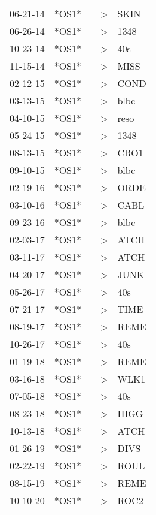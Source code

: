 \begin{supertabular}{lllll}
 06-21-14 &  *OS1* &    &     \textgreater &  SKIN \\
 06-26-14 &  *OS1* &    &     \textgreater &  1348 \\
 10-23-14 &  *OS1* &    &     \textgreater &   40s \\
 11-15-14 &  *OS1* &    &     \textgreater &  MISS \\
 02-12-15 &  *OS1* &    &     \textgreater &  COND \\
 03-13-15 &  *OS1* &    &     \textgreater &  blbc \\
 04-10-15 &  *OS1* &    &     \textgreater &  reso \\
 05-24-15 &  *OS1* &    &     \textgreater &  1348 \\
 08-13-15 &  *OS1* &    &     \textgreater &  CRO1 \\
 09-10-15 &  *OS1* &    &     \textgreater &  blbc \\
 02-19-16 &  *OS1* &    &     \textgreater &  ORDE \\
 03-10-16 &  *OS1* &    &     \textgreater &  CABL \\
 09-23-16 &  *OS1* &    &     \textgreater &  blbc \\
 02-03-17 &  *OS1* &    &     \textgreater &  ATCH \\
 03-11-17 &  *OS1* &    &     \textgreater &  ATCH \\
 04-20-17 &  *OS1* &    &     \textgreater &  JUNK \\
 05-26-17 &  *OS1* &    &     \textgreater &   40s \\
 07-21-17 &  *OS1* &    &     \textgreater &  TIME \\
 08-19-17 &  *OS1* &    &     \textgreater &  REME \\
 10-26-17 &  *OS1* &    &     \textgreater &   40s \\
 01-19-18 &  *OS1* &    &     \textgreater &  REME \\
 03-16-18 &  *OS1* &    &     \textgreater &  WLK1 \\
 07-05-18 &  *OS1* &    &     \textgreater &   40s \\
 08-23-18 &  *OS1* &    &     \textgreater &  HIGG \\
 10-13-18 &  *OS1* &    &     \textgreater &  ATCH \\
 01-26-19 &  *OS1* &    &     \textgreater &  DIVS \\
 02-22-19 &  *OS1* &    &     \textgreater &  ROUL \\
 08-15-19 &  *OS1* &    &     \textgreater &  REME \\
 10-10-20 &  *OS1* &    &     \textgreater &  ROC2 \\
\end{supertabular}

